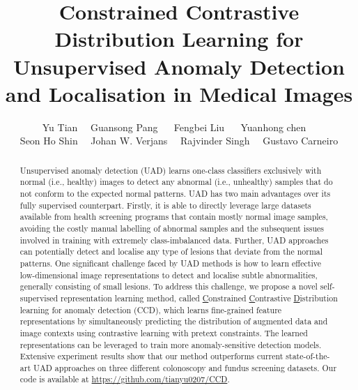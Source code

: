 \documentclass[runningheads]{llncs}
\begin{document}
\title{Constrained Contrastive Distribution Learning for Unsupervised Anomaly Detection and Localisation in Medical Images}

\author{Yu Tian$\quad$
Guansong Pang  $\quad$
Fengbei Liu  $\quad$
Yuanhong chen$\quad$ \\
Seon Ho Shin$\quad$ 
Johan W. Verjans$\quad$
Rajvinder Singh$\quad$
Gustavo Carneiro}




\maketitle              \begin{abstract}



Unsupervised anomaly detection (UAD) learns one-class classifiers exclusively with normal (i.e., healthy) images to detect any abnormal (i.e., unhealthy) samples that do not conform to the expected normal patterns. UAD has two main advantages over its fully supervised counterpart. Firstly, it is able to directly leverage large datasets available from health screening programs that contain mostly normal image samples, avoiding the costly manual labelling of abnormal samples and the subsequent issues involved in training with extremely class-imbalanced data. Further, UAD approaches can potentially detect and localise any type of lesions that deviate from the normal patterns. One significant challenge faced by UAD methods is how to learn effective low-dimensional image representations to detect and localise subtle abnormalities, generally consisting of small lesions. To address this challenge, we propose a novel self-supervised representation learning method, called \underline{C}onstrained \underline{C}ontrastive \underline{D}istribution learning for anomaly detection (CCD), which learns fine-grained feature representations by simultaneously predicting the distribution of augmented data and image contexts using contrastive learning with pretext constraints. The learned representations can be leveraged to train more anomaly-sensitive detection models. Extensive experiment results show that our method outperforms current state-of-the-art UAD approaches on three different colonoscopy and fundus screening datasets. Our code is available at \url{https://github.com/tianyu0207/CCD}. 




\end{abstract}
\end{document}
